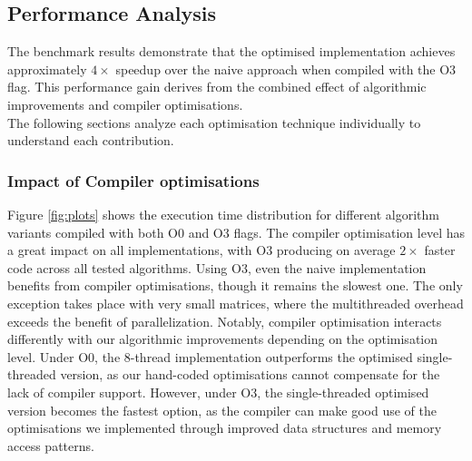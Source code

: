 

\newpage

\subsection{Performance Analysis}\label{sec:data_anal}
The benchmark results demonstrate that the optimised implementation achieves approximately $4\times$ speedup over the naive approach when compiled with the O3 flag. 
This performance gain derives from the combined effect of algorithmic improvements and compiler optimisations.\\
The following sections analyze each optimisation technique individually to understand each contribution.

\subsubsection{Impact of Compiler optimisations}\label{sec:compiler_impact}
Figure \ref{fig:plots} shows the execution time distribution for different algorithm variants compiled with both O0 and O3 flags. 
The compiler optimisation level has a great impact on all implementations, with O3 producing on average $2\times$ faster code across all tested algorithms.
Using O3, even the naive implementation benefits from compiler optimisations, though it remains the slowest one. 
The only exception takes place with very small matrices, where the multithreaded overhead exceeds the benefit of parallelization.
Notably, compiler optimisation interacts differently with our algorithmic improvements depending on the optimisation level. 
Under O0, the 8-thread implementation outperforms the optimised single-threaded version, as our hand-coded optimisations cannot compensate for the lack of compiler support. 
However, under O3, the single-threaded optimised version becomes the fastest option, as the compiler can make good use of the optimisations we implemented through improved data structures and memory access patterns.

